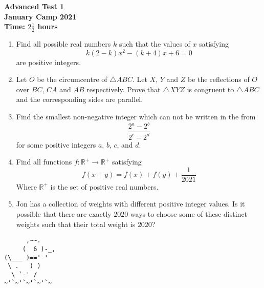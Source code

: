 \documentclass{article}
\begin{document}
\thispagestyle{empty}

\begin{center}
  \textbf{\Large Advanced Test 1}
  \\ \vspace{1em}
  \textbf{\large January Camp 2021}
  \\ \vspace{1em}
  \textbf{\large Time: $2\frac{1}{2}$ hours}
\end{center}

\vspace{24pt}

\begin{enumerate}[1.]

\item %
Find all possible real numbers $k$ such that the values of $x$ satisfying
$$k(2 - k)x^2 - (k + 4)x + 6 = 0$$
are positive integers.


\item %
Let $O$ be the circumcentre of $\triangle ABC$. Let $X$, $Y$ and $Z$ be the reflections of $O$ over $BC$, $CA$ and $AB$ respectively. Prove that $\triangle XYZ$ is congruent to $\triangle ABC$ and the corresponding sides are parallel.


\item %
Find the smallest non-negative integer which can not be written in the from
\[
  \frac{2^a - 2^b}{2^c - 2^d}
\]
for some positive integers $a$, $b$, $c$, and $d$.


\item %
Find all functions $f: \mathbb{R}^+ \rightarrow \mathbb{R}^+$ satisfying 
$$f(x + y) = f(x) + f(y) + \frac{1}{2021} $$
Where $\mathbb{R}^+$ is the set of positive real numbers. 

\item %
Jon has a collection of weights with different positive integer values. Is it possible that there are exactly $2020$ ways to choose some of these distinct weights such that their total weight is $2020$?

\end{enumerate}


\vfill
\centering
\begin{BVerbatim}
      ,~~.
     (  6 )-_,
(\___ )=='-'
 \ .   ) )
  \ `-' /    
~'`~'`~'`~'`~
\end{BVerbatim}
\end{document}
